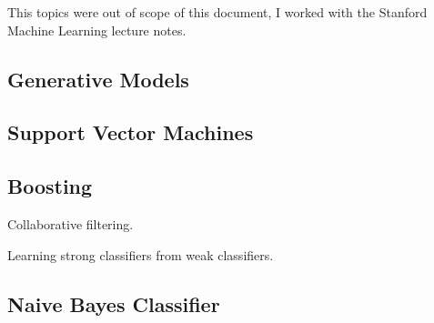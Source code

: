 This topics were out of scope of this document, I worked with the Stanford Machine Learning lecture notes.

\subsection{Generative Models}

\subsection{Support Vector Machines}

\subsection{Boosting}
Collaborative filtering.

Learning strong classifiers from weak classifiers.

\subsection{Naive Bayes Classifier}


